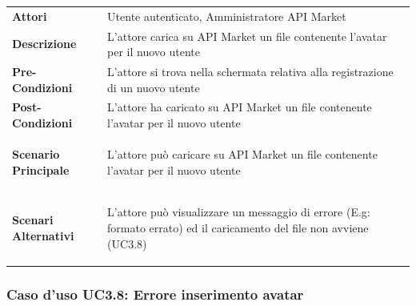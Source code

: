 \begin{minipage}{\linewidth}
	\begin{tabular}{ l | p{11cm}}
		\hline
		\rowcolor{Gray}
		\multicolumn{2}{c}{UC3.7 - Inserimento avatar} \\
		\hline
		\textbf{Attori} & Utente autenticato, Amministratore API Market \\
		\textbf{Descrizione} & L'attore carica su API Market un file contenente l'avatar per il nuovo utente \\
		\textbf{Pre-Condizioni} & L'attore si trova nella schermata relativa alla registrazione di un nuovo utente \\
		\textbf{Post-Condizioni} & L'attore ha caricato su API Market un file contenente l'avatar per il nuovo utente \\
		\textbf{Scenario Principale} & 
		\begin{enumerate*}[label=(\arabic*.),itemjoin={\newline}]
			\item L'attore può caricare su API Market un file contenente l'avatar per il nuovo utente
		\end{enumerate*}\\
		\textbf{Scenari Alternativi} & 
		\begin{enumerate*}[label=(\arabic*.),itemjoin={\newline}]
		\item L'attore può visualizzare un messaggio di errore (E.g: formato errato) ed il caricamento del file non avviene (UC3.8)
		\end{enumerate*}\\
	\end{tabular}
\end{minipage}

\subsubsection{Caso d'uso UC3.8: Errore inserimento avatar}
\label{UC3_8}

